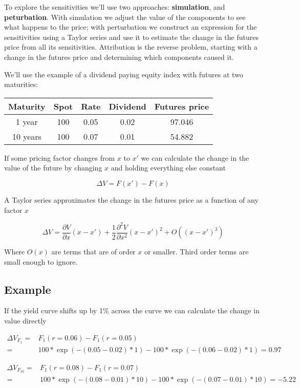\documentclass{tran-l}
\theoremstyle{definition}
\theoremstyle{remark}
\numberwithin{equation}{subsection}
\begin{document}
To explore the sensitivities we'll use two approaches: \textbf{simulation}, and \textbf{peturbation}. With simulation we adjust the value of the components to see what happens to the price; with perturbation we construct an expression for the sensitivities using a Taylor series and use it to estimate the change in the futures price from all its sensitivities. Attribution is the reverse problem, starting with a change in the futures price and determining which components caused it. 

We'll use the example of a dividend paying equity index with futures at two maturities:

\begin{center}
\begin{tabular}{|ccccc|}
\hline
Maturity & Spot & Rate & Dividend & Futures price\\
\hline
1 year & 100 & 0.05 & 0.02 & 97.046\\
10 years & 100 & 0.07 & 0.01& 54.882\\
\hline
\end{tabular} 
\end{center}

If some pricing factor changes from $x$ to $x'$ we can calculate the change in the value of the future by changing $x$ and holding everything else constant

\[\Delta V = F(x') - F(x)  \]

A Taylor series approximates the change in the futures price as a function of any factor $x$

\[ \Delta V = \frac{\partial V}{\partial x}  (x-x') + \frac{1}{2}\frac{\partial^2 V}{\partial x^2} (x-x')^2 + O((x-x')^3) \]

Where $O(x)$ are terms that are of order $x$ or smaller. Third order terms are small enough to ignore.

\subsection{Example}

If the yield curve shifts up by 1\% across the curve we can calculate the change in value directly

\begin{eqnarray*}
\Delta V_{F_1} =& F_1(r = 0.06) - F_1(r = 0.05) \\
=& 100*\exp(-(0.05-0.02)*1) - 100*\exp(-(0.06-0.02)*1) = 0.97
\end{eqnarray*}

\begin{eqnarray*}
\Delta V_{F_{10}} =& F_1(r = 0.08) - F_1(r = 0.07) \\
 =&100*\exp(-(0.08-0.01)*10) - 100*\exp(-(0.07-0.01)*10) = -5.22\\
\end{eqnarray*}
\end{document}
